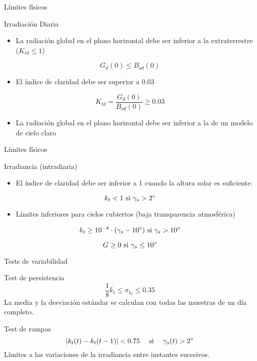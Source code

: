 \documentclass[aspectratio=169, usenames,svgnames,dvipsnames]{beamer}
\begin{document}
\begin{frame}[label={sec:org588b7e6}]{Límites físicos}
\begin{block}{Irradiación Diaria}
\begin{itemize}
\item La radiación global en el plano horizontal debe ser inferior a la extraterrestre (\(K_{td} \leq 1\))
\end{itemize}
\[
G_d(0) \leq B_{od}(0)
\]

\begin{itemize}
\item El índice de claridad debe ser superior a 0.03
\end{itemize}
\[
K_{td} = \frac{G_d(0)}{B_{od}(0)} \geq 0.03
\]

\begin{itemize}
\item La radiación global en el plano horizontal debe ser inferior a la de un modelo de cielo claro
\end{itemize}

\nocite{Younes.Claywell.ea2005, Estevez.Gavilan.ea2011, Geiger.Diabate.ea2002}
\end{block}
\end{frame}

\begin{frame}[label={sec:orga0fc560}]{Límites físicos}
\begin{block}{Irradiancia (intradiaria)}
\begin{itemize}
\item El índice de claridad debe ser inferior a 1 cuando la altura solar es suficiente:
\end{itemize}
\[
k_t < 1  \text{ si } \gamma_s > 2\degree 
\]
\begin{itemize}
\item Límites inferiores para cielos cubiertos (baja transparencia atmosférica)
\end{itemize}
\[
k_t \geq 10^{-4} \cdot (\gamma_s - 10\degree)  \text{ si } \gamma_s > 10\degree
\]

\[
G \geq 0  \text{ si } \gamma_s \leq 10\degree
\]

\nocite{Journee.Bertrand2011}
\end{block}
\end{frame}

\begin{frame}[label={sec:org28648a8}]{Tests de variabilidad}
\begin{block}{Test de persistencia}
\[
\frac{1}{8} \overline{k_t} \leq \sigma_{k_t} \leq 0.35
\]
La media y la desviación estándar se calculan con todas las muestras de un día completo.
\end{block}

\begin{block}{Test de rampas}
\[
\left| k_t(t) - k_t(t-1)\right| < 0.75 \quad \text{ si } \quad \gamma_s(t) > 2\degree
\]
Límites a las variaciones de la irradiancia entre instantes sucesivos.
\end{block}
\end{frame}
\end{document}
